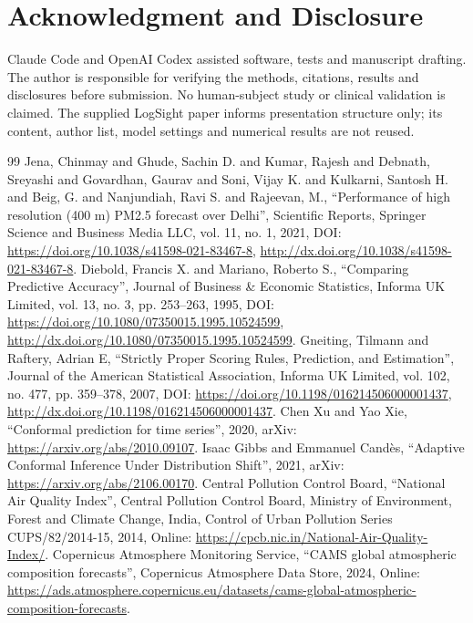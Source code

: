 \documentclass[journal]{IEEEtran}
\begin{document}
\section*{Acknowledgment and Disclosure}
Claude Code and OpenAI Codex assisted software, tests and manuscript drafting.
The author is responsible for verifying the methods, citations, results and
disclosures before submission. No human-subject study or clinical validation
is claimed. The supplied LogSight paper informs presentation structure only;
its content, author list, model settings and numerical results are not reused.

\balance
\begin{thebibliography}{99}
 Jena, Chinmay and Ghude, Sachin D. and Kumar, Rajesh and Debnath, Sreyashi and Govardhan, Gaurav and Soni, Vijay K. and Kulkarni, Santosh H. and Beig, G. and Nanjundiah, Ravi S. and Rajeevan, M., ``Performance of high resolution (400 m) PM2.5 forecast over Delhi'', Scientific Reports, Springer Science and Business Media LLC, vol. 11, no. 1, 2021, DOI: \url{https://doi.org/10.1038/s41598-021-83467-8}, \url{http://dx.doi.org/10.1038/s41598-021-83467-8}.
 Diebold, Francis X. and Mariano, Roberto S., ``Comparing Predictive Accuracy'', Journal of Business \& Economic Statistics, Informa UK Limited, vol. 13, no. 3, pp. 253--263, 1995, DOI: \url{https://doi.org/10.1080/07350015.1995.10524599}, \url{http://dx.doi.org/10.1080/07350015.1995.10524599}.
 Gneiting, Tilmann and Raftery, Adrian E, ``Strictly Proper Scoring Rules, Prediction, and Estimation'', Journal of the American Statistical Association, Informa UK Limited, vol. 102, no. 477, pp. 359--378, 2007, DOI: \url{https://doi.org/10.1198/016214506000001437}, \url{http://dx.doi.org/10.1198/016214506000001437}.
 Chen Xu and Yao Xie, ``Conformal prediction for time series'', 2020, arXiv: \url{https://arxiv.org/abs/2010.09107}.
 Isaac Gibbs and Emmanuel Candès, ``Adaptive Conformal Inference Under Distribution Shift'', 2021, arXiv: \url{https://arxiv.org/abs/2106.00170}.
 {Central Pollution Control Board}, ``National Air Quality Index'', Central Pollution Control Board, Ministry of Environment, Forest and Climate Change, India, Control of Urban Pollution Series CUPS/82/2014-15, 2014, Online: \url{https://cpcb.nic.in/National-Air-Quality-Index/}.
 {Copernicus Atmosphere Monitoring Service}, ``CAMS global atmospheric composition forecasts'', Copernicus Atmosphere Data Store, 2024, Online: \url{https://ads.atmosphere.copernicus.eu/datasets/cams-global-atmospheric-composition-forecasts}.

\end{thebibliography}
\end{document}
